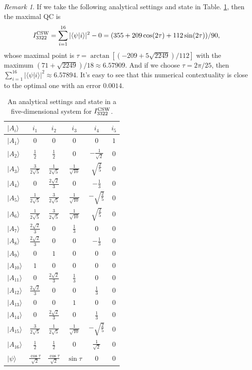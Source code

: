 \documentclass[pra,aps,notitlepage,superscriptaddress,showpacs,showkeys]{revtex4-1}
\theoremstyle{definition}
\theoremstyle{remark}
\newtheorem{remark}{Remark}
\begin{document}
\begin{remark}
If we take the following analytical settings and state in Table. \ref{analytical}, then  the maximal QC  is
\[
I_{3322}^{\rm CSW} = \sum_{i=1}^{16} |\langle \psi|i\rangle|^2 -0= (355+209\cos(2\tau)+112\sin(2\tau))/90,
\]
whose maximal point is $\tau = \arctan[(-209 + 5 \sqrt{2249})/112]$ with the maximum $\left(71+\sqrt{2249}\right)/18 \approx 6.57909$.
And if we choose $\tau = 2\pi/25$, then $\sum_{i=1}^{16} |\langle \psi|i\rangle|^2 \approx 6.57894$. It's easy to see that this numerical contextuality is close to the optimal one with an error $0.0014$.
\begin{table}[t]
\centering
\caption{An analytical settings and state in a five-dimensional system for $I_{3322}^{\rm CSW}$.}
  \begin{tabular}{lccccc} \hline \hline
$|A_i\rangle$ & $i_1$ & $i_2$ & $i_3$ & $i_4$ & $i_5$ \\
\hline
$|A_1\rangle$  & $0$ & $0$ & $0$ & $0$ & $1$ \\
$|A_2\rangle$  & $\frac{1}{2}$ & $\frac{1}{2}$ & $0$ & $-\frac{1}{\sqrt{2}}$ & $0$ \\
$|A_3\rangle$  & $\frac{3}{2 \sqrt{5}}$ & $\frac{1}{2 \sqrt{5}}$ & $\frac{1}{\sqrt{10}}$ & $\sqrt{\frac{2}{5}}$ & $0$ \\
$|A_4\rangle$  & $0$ & $\frac{2 \sqrt{2}}{3}$ & $0$ & $-\frac{1}{3}$ & $0$ \\
$|A_5\rangle$  & $\frac{1}{2 \sqrt{5}}$ & $\frac{3}{2 \sqrt{5}}$ & $\frac{1}{\sqrt{10}}$ & $-\sqrt{\frac{2}{5}}$ & $0$ \\
$|A_6\rangle$  & $\frac{1}{2 \sqrt{5}}$ & $\frac{3}{2 \sqrt{5}}$ & $\frac{1}{\sqrt{10}}$ & $\sqrt{\frac{2}{5}}$ & $0$ \\
$|A_7\rangle$  & $\frac{2 \sqrt{2}}{3}$ & $0$ & $\frac{1}{3}$ & $0$ & $0$ \\
$|A_8\rangle$  & $\frac{2 \sqrt{2}}{3}$ & $0$ & $0$ & $-\frac{1}{3}$ & $0$ \\
$|A_9\rangle$  & $0$ & $1$ & $0$ & $0$ & $0$ \\
$|A_{10}\rangle$ & $1$ & $0$ & $0$ & $0$ & $0$ \\
$|A_{11}\rangle$ & $0$ & $\frac{2 \sqrt{2}}{3}$ & $\frac{1}{3}$ & $0$ & $0$ \\
$|A_{12}\rangle$ & $\frac{2 \sqrt{2}}{3}$ & $0$ & $0$ & $\frac{1}{3}$ & $0$ \\
$|A_{13}\rangle$ & $0$ & $0$ & $1$ & $0$ & $0$ \\
$|A_{14}\rangle$ & $0$ & $\frac{2 \sqrt{2}}{3}$ & $0$ & $\frac{1}{3}$ & $0$ \\
$|A_{15}\rangle$ & $\frac{3}{2 \sqrt{5}}$ & $\frac{1}{2 \sqrt{5}}$ & $\frac{1}{\sqrt{10}}$ & $-\sqrt{\frac{2}{5}}$ & $0$  \\
$|A_{16}\rangle$ & $\frac{1}{2}$ & $\frac{1}{2}$ & $0$ & $\frac{1}{\sqrt{2}}$ & $0$ \\
\hline
$|\psi\rangle$ & $\frac{\cos\tau}{\sqrt{2}}$ & $\frac{\cos\tau}{\sqrt{2}}$ & $\sin\tau$ & $0$ & $0$ \\
  \hline \hline
   \end{tabular}
\label{analytical}
\end{table}
\end{remark}
\end{document}
